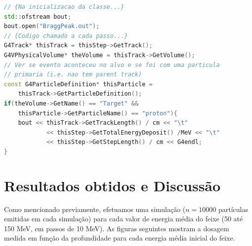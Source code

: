 \documentclass[a4paper, 12pt]{article} %
\begin{document}
	\begin{lstlisting}[language=C++]
// {Na inicializacao da classe...}
std::ofstream bout;
bout.open("BraggPeak.out");
// {Codigo chamado a cada passo...}
G4Track* thisTrack = thisStep->GetTrack();
G4VPhysicalVolume* theVolume = thisTrack->GetVolume();
// Ver se evento aconteceu no alvo e se foi com uma particula 
// primaria (i.e. nao tem parent track)
const G4ParticleDefinition* thisParticle = 
	thisTrack->GetParticleDefinition();
if(theVolume->GetName() == "Target" && 
	thisParticle->GetParticleName() == "proton"){
	bout << thisTrack->GetTrackLength() / cm << "\t"
			<< thisStep->GetTotalEnergyDeposit() /MeV << "\t"
			<< thisStep->GetStepLength() / cm << G4endl;
}

	\end{lstlisting}
	

	\section{Resultados obtidos e Discussão}
	Como mencionado previamente, efetuamos uma simulação ($n=10000$ partículas emitidas em cada simulação) para cada valor de energia média do feixe (50 até 150 MeV, em passos de 10 MeV). As figuras seguintes mostram a dosagem medida em função da profundidade para cada energia média inicial do feixe.
\end{document}
